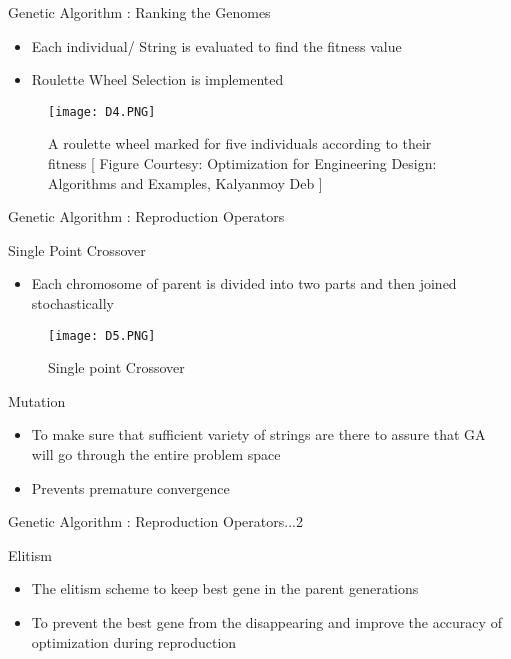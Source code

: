 \documentclass{beamer}
\begin{document}
\begin{frame}{Genetic Algorithm : Ranking the Genomes}

\begin{itemize}
  \item Each individual/ String is evaluated to find the fitness value

\item Roulette Wheel Selection is implemented

\end{itemize}
\begin{figure}
\texttt{[image: D4.PNG]}
\caption{\label{fig:your-figure12} A roulette wheel marked for five individuals according to their fitness [ Figure Courtesy: Optimization for Engineering Design: Algorithms and Examples, Kalyanmoy Deb ]}
\end{figure}
\end{frame}
\begin{frame}{Genetic Algorithm : Reproduction Operators}
\begin{block}{Single Point Crossover}
\begin{itemize}
  \item Each chromosome of parent is divided into two parts and then joined stochastically
\end{itemize}
\end{block}
\begin{figure}
\texttt{[image: D5.PNG]}
\caption{\label{fig:your-figure13} Single point Crossover}
\end{figure}
\begin{block}{Mutation}
\begin{itemize}
  \item To make sure that sufficient variety of strings are there to assure that GA will go through the entire problem space
  \item Prevents premature convergence
\end{itemize}
\end{block}
\end{frame}
\begin{frame}{Genetic Algorithm : Reproduction Operators...2}
\begin{block}{Elitism}
\begin{itemize}
  \item The elitism scheme to keep best gene in the parent generations
  \item To prevent the best gene from the disappearing and improve the accuracy of
optimization during reproduction
\end{itemize}
\end{block}
\end{frame}
\end{document}
